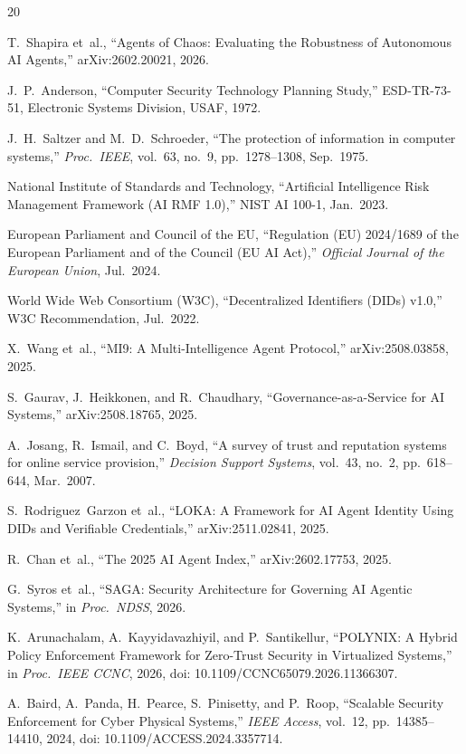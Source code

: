 \documentclass{IEEEcsmag}
\begin{document}
\begin{thebibliography}{20}

T.~Shapira et~al., ``Agents of Chaos: Evaluating the Robustness of Autonomous AI Agents,'' arXiv:2602.20021, 2026.

J.~P.~Anderson, ``Computer Security Technology Planning Study,'' ESD-TR-73-51, Electronic Systems Division, USAF, 1972.

J.~H.~Saltzer and M.~D.~Schroeder, ``The protection of information in computer systems,'' {\it Proc.\ IEEE}, vol.~63, no.~9, pp.~1278--1308, Sep.\ 1975.

National Institute of Standards and Technology, ``Artificial Intelligence Risk Management Framework (AI RMF 1.0),'' NIST AI 100-1, Jan.\ 2023.

European Parliament and Council of the EU, ``Regulation (EU) 2024/1689 of the European Parliament and of the Council (EU AI Act),'' {\it Official Journal of the European Union}, Jul.\ 2024.

World Wide Web Consortium (W3C), ``Decentralized Identifiers (DIDs) v1.0,'' W3C Recommendation, Jul.\ 2022.

X.~Wang et~al., ``MI9: A Multi-Intelligence Agent Protocol,'' arXiv:2508.03858, 2025.

S.~Gaurav, J.~Heikkonen, and R.~Chaudhary, ``Governance-as-a-Service for AI Systems,'' arXiv:2508.18765, 2025.

A.~Josang, R.~Ismail, and C.~Boyd, ``A survey of trust and reputation systems for online service provision,'' {\it Decision Support Systems}, vol.~43, no.~2, pp.~618--644, Mar.\ 2007.

S.~Rodriguez~Garzon et~al., ``LOKA: A Framework for AI Agent Identity Using DIDs and Verifiable Credentials,'' arXiv:2511.02841, 2025.

R.~Chan et~al., ``The 2025 AI Agent Index,'' arXiv:2602.17753, 2025.

G.~Syros et~al., ``SAGA: Security Architecture for Governing AI Agentic Systems,'' in {\it Proc.\ NDSS}, 2026.

K.~Arunachalam, A.~Kayyidavazhiyil, and P.~Santikellur, ``POLYNIX: A Hybrid Policy Enforcement Framework for Zero-Trust Security in Virtualized Systems,'' in {\it Proc.\ IEEE CCNC}, 2026, doi: 10.1109/CCNC65079.2026.11366307.

A.~Baird, A.~Panda, H.~Pearce, S.~Pinisetty, and P.~Roop, ``Scalable Security Enforcement for Cyber Physical Systems,'' {\it IEEE Access}, vol.~12, pp.~14385--14410, 2024, doi: 10.1109/ACCESS.2024.3357714.


\end{thebibliography}
\end{document}
